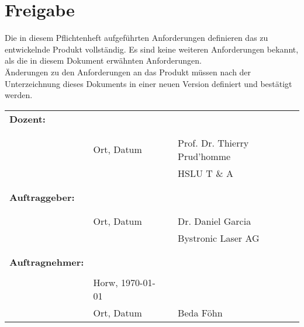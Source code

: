 \section{Freigabe}
Die in diesem Pflichtenheft aufgeführten Anforderungen definieren das zu entwickelnde Produkt vollständig. Es sind keine weiteren Anforderungen bekannt, als die in diesem Dokument erwähnten Anforderungen.\\

Änderungen zu den Anforderungen an das Produkt müssen nach der Unterzeichnung dieses Dokuments in einer neuen Version definiert und bestätigt werden.\\\break

\begin{longtable}{p{4cm}p{4cm}p{0.2cm}p{6cm}}	
	\textbf{Dozent:} & & &\\
	& & &\\
	& & &\\\cline{2-2}\cline{4-4}
	&Ort, Datum & & Prof. Dr. Thierry Prud'homme\\
	& & &HSLU T \& A\\
	
	& & &\\
	& & &\\
	
	\textbf{Auftraggeber:} & & &\\
	& & &\\
	& & &\\\cline{2-2}\cline{4-4}
	&Ort, Datum & & Dr. Daniel Garcia\\
	& & &Bystronic Laser AG\\
	
	& & &\\
	& & &\\
	
	\textbf{Auftragnehmer:} & & &\\
	& & &\\
	& Horw, \today & &\\\cline{4-4}
	&Ort, Datum & & Beda Föhn\\
\end{longtable}

